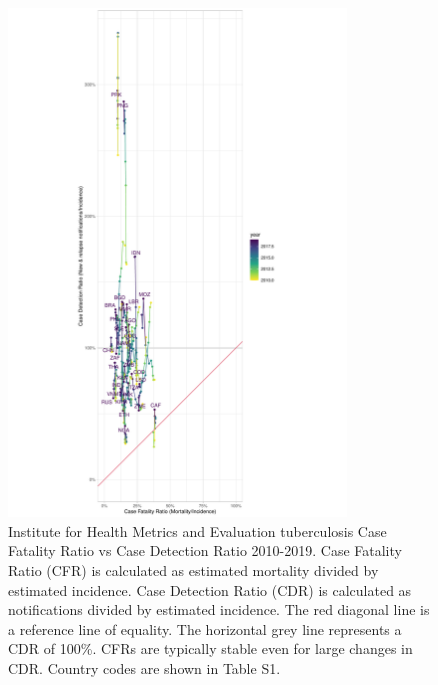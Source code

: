\documentclass[12pt]{article}
\begin{document}
\begin{figure}
  \centering
  \includegraphics[width=0.8\textwidth]{../plots/aF8.pdf}
  \caption[Case Fatality Ratio vs Case Detection Ratio]{Institute for Health Metrics
    and Evaluation tuberculosis Case Fatality Ratio vs
    Case Detection Ratio 2010-2019. Case Fatality Ratio (CFR) is calculated as estimated
    mortality divided by estimated incidence.
    Case Detection Ratio (CDR) is calculated as notifications divided by
    estimated incidence. The red diagonal line is a reference line of equality.
    The horizontal grey line represents a CDR of 100\%. CFRs are typically
    stable even for large changes in CDR. Country codes are shown in Table S1.}
\end{figure}

\FloatBarrier
\end{document}
